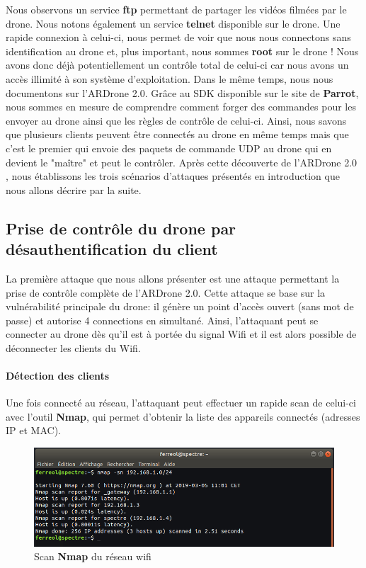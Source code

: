 Nous observons un service \textbf{ftp} permettant de partager les vidéos filmées par le drone. Nous notons également un service \textbf{telnet} disponible sur le drone. Une rapide connexion à celui-ci, nous permet de voir que nous nous connectons sans identification au drone et, plus important, nous sommes \textbf{root} sur le drone ! Nous avons donc déjà potentiellement un contrôle total de celui-ci car nous avons un accès illimité à son système d'exploitation.
\newline
Dans le même temps, nous nous documentons sur l'ARDrone 2.0. Grâce au SDK disponible sur le site de \textbf{Parrot}, nous sommes en mesure de comprendre comment forger des commandes pour les envoyer au drone ainsi que les règles de contrôle de celui-ci. Ainsi, nous savons que plusieurs clients peuvent être connectés au drone en même temps mais que c'est le premier qui envoie des paquets de commande UDP au drone qui en devient le "maître" et peut le contrôler.
\newline Après cette découverte de l'ARDrone 2.0 , nous établissons les trois scénarios d'attaques présentés en introduction que nous allons décrire par la suite.

\subsection{Prise de contrôle du drone par désauthentification du client}
La première attaque que nous allons présenter est une attaque permettant la prise de contrôle complète de l'ARDrone 2.0. Cette attaque se base sur la vulnérabilité principale du drone: il génère un point d'accès ouvert (sans mot de passe) et autorise 4 connections en simultané. Ainsi, l'attaquant peut se connecter au drone dès qu'il est à portée du signal Wifi et il est alors possible de déconnecter les clients du Wifi.
\paragraph{Détection des clients}
Une fois connecté au réseau, l'attaquant peut effectuer un rapide scan de celui-ci avec l'outil \textbf{Nmap}, qui permet d'obtenir la liste des appareils connectés (adresses IP et MAC).

\begin{figure}[H]
  \centering
  \includegraphics[scale=0.5]{images/nmap_res}
  \caption{Scan \textbf{Nmap} du réseau wifi}
\end{figure}

